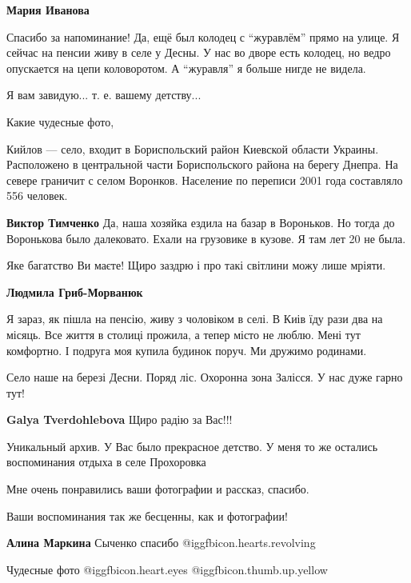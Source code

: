 \begin{itemize}
\begin{itemize} %
\textbf{Мария Иванова} 

Спасибо за напоминание! Да, ещё был колодец с \enquote{журавлём} прямо на улице. Я
сейчас на пенсии живу в селе у Десны. У нас во дворе есть колодец, но ведро
опускается на цепи коловоротом. А \enquote{журавля} я больше нигде не видела.

\end{itemize} %

Я вам завидую... т. е. вашему детству...

Какие чудесные фото,


Кийлов — село, входит в Бориспольский район Киевской области Украины.
Расположено в центральной части Бориспольского района на берегу Днепра. На
севере граничит с селом Воронков. Население по переписи 2001 года составляло
556 человек.

\begin{itemize} %
\textbf{Виктор Тимченко} Да, наша хозяйка ездила на базар в Вороньков. Но тогда до Воронькова было далековато. Ехали на грузовике в кузове. Я там лет 20 не была.
\end{itemize} %


Яке багатство Ви маєте! Щиро заздрю і про такі світлини можу лише мріяти.

\begin{itemize} %
\textbf{Людмила Гриб-Морванюк} 

Я зараз, як пішла на пенсію, живу з чоловіком в селі. В Киів їду рази два на
місяць. Все життя в столиці прожила, а тепер місто не люблю. Мені тут
комфортно. І подруга моя купила будинок поруч. Ми дружимо родинами.

Село наше на березі Десни. Поряд ліс. Охоронна зона Залісся. У нас дуже гарно
тут!


\textbf{Galya Tverdohlebova} Щиро радію за Вас!!!
\end{itemize} %


Уникальный архив. У Вас было прекрасное детство. У меня то же остались
воспоминания отдыха в селе Прохоровка

Мне очень понравились ваши фотографии и рассказ, спасибо.

Ваши воспоминания так же бесценны, как и фотографии!

\textbf{Алина Маркина} Сыченко спасибо @igg{fbicon.hearts.revolving} 

Чудесные фото @igg{fbicon.heart.eyes}  @igg{fbicon.thumb.up.yellow} 


\end{itemize} %
